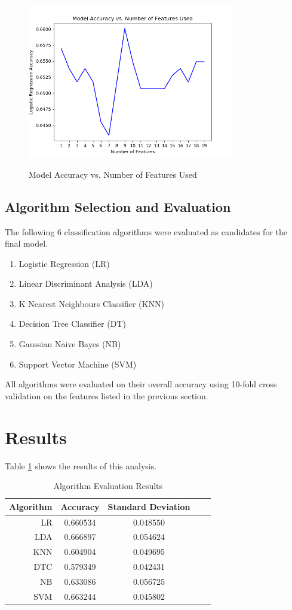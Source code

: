 \documentclass{article}
\begin{document}
\begin{figure}[h]
\includegraphics[width=9cm]{images/FeatureSelection.png}\label{fig:feature_selection}
\caption{Model Accuracy vs. Number of Features Used}
\centering
\end{figure}

\subsection{Algorithm Selection and Evaluation}

The following 6 classification algorithms were evaluated as candidates for the final model. 
\begin{enumerate}
	\item Logistic Regression (LR)
	\item Linear Discriminant Analysis (LDA)
	\item K Nearest Neighbours Classifier (KNN)
	\item Decision Tree Classifier (DT)
	\item Gaussian Naive Bayes (NB)
	\item Support Vector Machine (SVM)
\end{enumerate}

All algorithms were evaluated on their overall accuracy using 10-fold cross validation on the features listed in the previous section. 
\section{Results}
Table \ref{tab:algs}  shows the results of this analysis. 

\begin{table}[!htb]
\setlength\tabcolsep{0pt} %
\footnotesize\centering
\smallskip 
\begin{tabular*}{\columnwidth}{@{\extracolsep{\fill}}rcccr}
\toprule
  Algorithm&Accuracy&Standard Deviation \\
\midrule
  LR  & 0.660534    &0.048550\\
  LDA & 0.666897 & 0.054624\\
  KNN & 0.604904 & 0.049695\\
  DTC & 0.579349 & 0.042431\\
  NB & 0.633086  & 0.056725\\
  SVM & 0.663244  & 0.045802\\
  \midrule
\bottomrule
\end{tabular*}
\caption{Algorithm Evaluation Results} \label{tab:algs}
\end{table}
\end{document}
